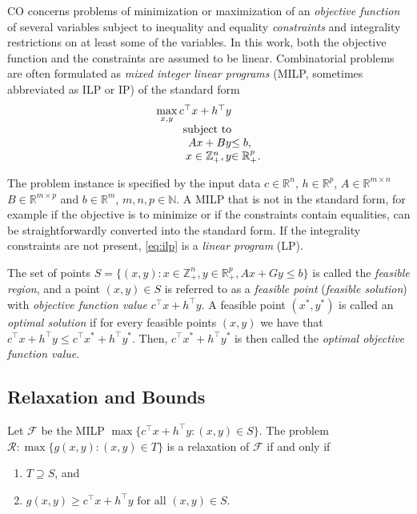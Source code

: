 CO concerns problems of minimization or maximization of an \emph{objective function} of several variables 
subject to inequality and equality \emph{constraints} and integrality restrictions on at least some of the variables.
In this work, both the objective function and the constraints are assumed to be linear.
Combinatorial problems are often formulated as \emph{mixed integer linear programs} (MILP, sometimes abbreviated as ILP or IP) of the standard form
\begin{equation}
\begin{array}{r@{}l}
	\max\limits_{x,y}c^\top x + h^\top y & \\
	\text{subject to}& \\
	  Ax + By &\leq b, \\
	  x \in \mathbb{Z}^{n}_+, y & \in\mathbb{R}^{p}_+. 
\end{array}
	\label{eq:ilp}
\end{equation}

The problem instance is specified by the input data $c\in \mathbb{R}^n$, $h \in \mathbb{R}^p$, 
$A \in \mathbb{R}^{m\times n}$  $B \in\mathbb{R}^{m\times p}$ and $b \in \mathbb{R}^m$, $m,n,p\in \mathbb{N}$.
A MILP that is not in the standard form, for example if the objective is to minimize or if the constraints contain equalities, can be straightforwardly converted into the standard form.
If the integrality constraints are not present, \eqref{eq:ilp} is a \emph{linear program} (LP).


The set of points $S=\{(x,y):  x \in \mathbb{Z}^{n}_+, y  \in\mathbb{R}^{p}_+, Ax + Gy \leq b\}$ is called the \emph{feasible region},  
and a point $(x,y)\in S$ is referred to as a \emph{feasible point} (\emph{feasible solution}) with \emph{objective function value} $c^\top x + h^\top y$. 
A feasible point $(x^*,y^*)$ is called an \emph{optimal solution} if for every feasible points $(x,y)$ we have that $c^\top x + h^\top y \leq c^\top x^* + h^\top y^*$. 
Then, $c^\top x^* + h^\top y^*$ is then called the \emph{optimal objective function value}. 

\subsection{Relaxation and Bounds}

\begin{definition}
	Let $\mathcal{F}$ be the MILP $\max\{c^\top x + h^\top y :(x,y)\in S\}$.
	The problem $\mathcal{R}: \max\{g(x,y):(x,y)\in T\}$ is a relaxation of $\mathcal{F}$ if and only if
	\begin{enumerate}
		\item $T\supseteq S$, and
		\item $g(x,y)\geq  c^\top x + h^\top y \text{ for all } (x,y)\in S$.
	\end{enumerate}
\end{definition}



